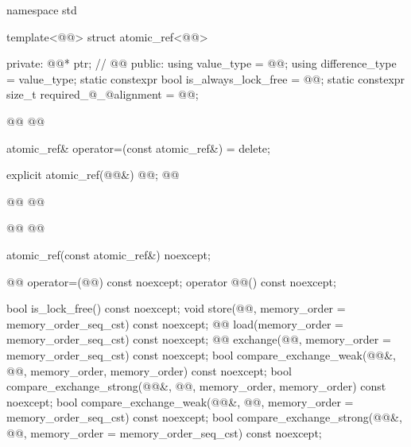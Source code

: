 \begin{codeblock}
namespace std {
  template<@@> struct atomic_ref<@@> {
  private:
    @@* ptr;        // \expos
    @@
  public:
    using value_type = @@;
    using difference_type = value_type;
    static constexpr bool is_always_lock_free = @@;
    static constexpr size_t required_@_@alignment = @@;

    @@
    @@

    atomic_ref& operator=(const atomic_ref&) = delete;

    explicit atomic_ref(@@&) @@;
    @@
    
    @@
    @@
    
    @@
    @@

    atomic_ref(const atomic_ref&) noexcept;

    @@ operator=(@@) const noexcept;
    operator @@() const noexcept;

    bool is_lock_free() const noexcept;
    void store(@@, memory_order = memory_order_seq_cst) const noexcept;
    @@ load(memory_order = memory_order_seq_cst) const noexcept;
    @@ exchange(@@,
                      memory_order = memory_order_seq_cst) const noexcept;
    bool compare_exchange_weak(@@&, @@,
                               memory_order, memory_order) const noexcept;
    bool compare_exchange_strong(@@&, @@,
                                 memory_order, memory_order) const noexcept;
    bool compare_exchange_weak(@@&, @@,
                               memory_order = memory_order_seq_cst) const noexcept;
    bool compare_exchange_strong(@@&, @@,
                                 memory_order = memory_order_seq_cst) const noexcept;

}}
\end{codeblock}
